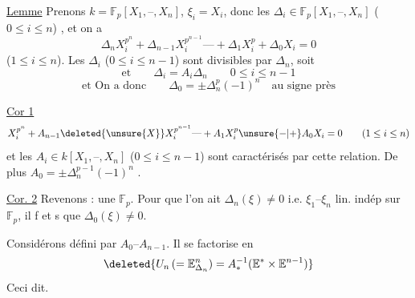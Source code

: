\uline{Lemme} Prenons $k=\mathbb F_p[X_1,\text{--},X_n]$, $\xi_i=X_i$, donc les  $\Delta_i\in\mathbb F_p[X_1,\text{--},X_n]$ ($0\leq i\leq n$) , et on  a
\[ \Delta_n X_i^{p^n}+\Delta_{n-1}X_i^{p^{n-1}}\text{---}+\Delta_1X_i^p+\Delta_0X_i=0 \]
($1\leq i\leq n$). Les $\Delta_i$ ($0\leq i\leq n-1$) sont divisibles par $\Delta_n$, soit
\[ \text{et}\qquad \Delta_i=A_i\Delta_n \qquad 0\leq i\leq n-1 \]
\[ \text{et On a donc}\qquad \Delta_0=\pm\Delta_n^p(-1)^n\quad\text{au signe près} \]

\uline{Cor 1} 
\[ X_i^{p^n}+A_{n-1}\deleted{\unsure{X}}X_i^{p^{n-1}}\text{---}+A_1X_i^p\unsure{-|+} A_0X_i=0 \qquad (1\leq i\leq n) \]
 et les $A_i\in k[X_1,\text{--},X_n]$ ($0\leq i\leq n-1$) sont caractérisés par cette relation.  De plus $A_0=\pm\Delta_n^{p-1}(-1)^n$ .

\uline{Cor. 2} Revenons {:} une   $\mathbb F_p$. Pour que l'on ait $\Delta_n(\xi)\neq0$ i.e. $\xi_1\text{--}\xi_n$ lin. indép sur $\mathbb F_p$, il f et s que $\Delta_0(\xi)\neq0$.

Considérons
défini par $A_0\text{--}A_{n-1}$. Il se factorise en
\[ \deleted{U_n\,(=\mathbb E^n_{\Delta_n})=A_*^{-1}(\mathbb E^*\times\mathbb E^{n-1})} \]
 Ceci dit.
